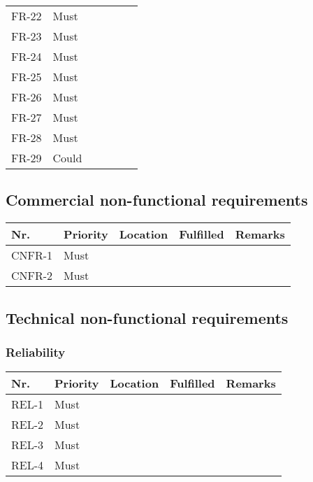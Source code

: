 \begin{table}[H]
\begin{tabular}{lllll}
        FR-22 & Must     & ~        & ~         & ~       \\ 
        FR-23 & Must     & ~        & ~         & ~       \\ 
        FR-24 & Must     & ~        & ~         & ~       \\ 
        FR-25 & Must     & ~        & ~         & ~       \\ 
        FR-26 & Must     & ~        & ~         & ~       \\ 
        FR-27 & Must     & ~        & ~         & ~       \\ 
        FR-28 & Must     & ~        & ~         & ~       \\ 
        FR-29 & Could    & ~        & ~         & ~       \\

    \end{tabular}
\end{table}

\subsection{Commercial non-functional requirements}
\begin{table}[H]
    \begin{tabular}{lllll}
    
        Nr.    & Priority & Location & Fulfilled & Remarks \\ \hline
        CNFR-1 & Must     & ~        & ~         & ~       \\ 
        CNFR-2 & Must     & ~        & ~         & ~       \\

    \end{tabular}
\end{table}

\subsection{Technical non-functional requirements}
\subsubsection{Reliability}
\begin{table}[H]
    \begin{tabular}{lllll}
    
        Nr.   & Priority & Location & Fulfilled & Remarks \\ \hline
        REL-1 & Must     & ~        & ~         & ~       \\ 
        REL-2 & Must     & ~        & ~         & ~       \\ 
        REL-3 & Must     & ~        & ~         & ~       \\ 
        REL-4 & Must     & ~        & ~         & ~       \\

    \end{tabular}
\end{table}

